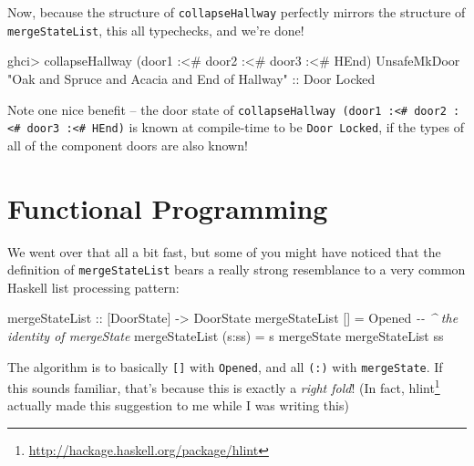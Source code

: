 \documentclass[]{article}
\newenvironment{Shaded}{}{}
\newcommand{\CommentTok}[1]{\textcolor[rgb]{0.38,0.63,0.69}{\textit{#1}}}
\newcommand{\DataTypeTok}[1]{\textcolor[rgb]{0.56,0.13,0.00}{#1}}
\newcommand{\NormalTok}[1]{#1}
\newcommand{\OperatorTok}[1]{\textcolor[rgb]{0.40,0.40,0.40}{#1}}
\newcommand{\OtherTok}[1]{\textcolor[rgb]{0.00,0.44,0.13}{#1}}
\newcommand{\StringTok}[1]{\textcolor[rgb]{0.25,0.44,0.63}{#1}}
\renewcommand{\href}[2]{#2\footnote{\url{#1}}}
\begin{document}
Now, because the structure of \texttt{collapseHallway} perfectly mirrors the
structure of \texttt{mergeStateList}, this all typechecks, and we're done!

\begin{Shaded}
\begin{Highlighting}[]
\NormalTok{ghci}\OperatorTok{>}\NormalTok{ collapseHallway (door1 }\OperatorTok{:<\#}\NormalTok{ door2 }\OperatorTok{:<\#}\NormalTok{ door3 }\OperatorTok{:<\#} \DataTypeTok{HEnd}\NormalTok{)}
\DataTypeTok{UnsafeMkDoor} \StringTok{"Oak and Spruce and Acacia and End of Hallway"}
\OtherTok{    ::} \DataTypeTok{Door} \DataTypeTok{\textquotesingle{}Locked}
\end{Highlighting}
\end{Shaded}

Note one nice benefit -- the door state of
\texttt{collapseHallway\ (door1\ :\textless{}\#\ door2\ :\textless{}\#\ door3\ :\textless{}\#\ HEnd)}
is known at compile-time to be \texttt{Door\ \textquotesingle{}Locked}, if the
types of all of the component doors are also known!

\hypertarget{functional-programming}{%
\section{Functional Programming}\label{functional-programming}}

We went over that all a bit fast, but some of you might have noticed that the
definition of \texttt{mergeStateList} bears a really strong resemblance to a
very common Haskell list processing pattern:

\begin{Shaded}
\begin{Highlighting}[]
\OtherTok{mergeStateList ::}\NormalTok{ [}\DataTypeTok{DoorState}\NormalTok{] }\OtherTok{{-}>} \DataTypeTok{DoorState}
\NormalTok{mergeStateList []     }\OtherTok{=} \DataTypeTok{Opened}               \CommentTok{{-}{-} \^{} the identity of mergeState}
\NormalTok{mergeStateList (s}\OperatorTok{:}\NormalTok{ss) }\OtherTok{=}\NormalTok{ s }\OtherTok{\textasciigrave{}mergeState\textasciigrave{}}\NormalTok{ mergeStateList ss}
\end{Highlighting}
\end{Shaded}

The algorithm is to basically \texttt{{[}{]}} with \texttt{Opened}, and all
\texttt{(:)} with \texttt{mergeState}. If this sounds familiar, that's because
this is exactly a \emph{right fold}! (In fact,
\href{http://hackage.haskell.org/package/hlint}{hlint} actually made this
suggestion to me while I was writing this)
\end{document}
